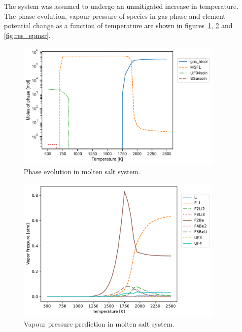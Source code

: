 The system was assumed to undergo an unmitigated increase in temperature. The phase evolution, vapour pressure of species in gas phase and element potential change as a function of temperature are shown in figures~\ref{fig:res_molemsr}, \ref{fig:res_vpmsr} and \ref{fig:res_epmsr}.
\begin{figure}[ht]
     \centering
     \includegraphics[width=0.9\textwidth]{figures/chapter-7/msr_moles.pdf}
     \caption{Phase evolution in molten salt system.}
     \label{fig:res_molemsr}
\end{figure}
\begin{figure}[ht]
     \centering
     \includegraphics[width=0.9\textwidth]{figures/chapter-7/msr_vp.pdf}
     \caption{Vapour pressure prediction in molten salt system.}
     \label{fig:res_vpmsr}
\end{figure}
